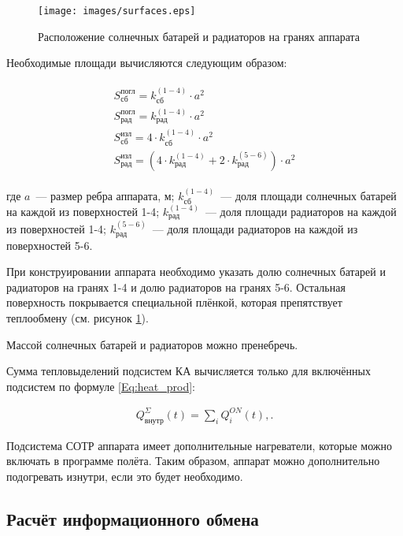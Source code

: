 \documentclass[12pt,a4paper]{article}
\begin{document}
\begin{figure}[tbh]
  \begin{center}
    \texttt{[image: images/surfaces.eps]}
    \caption{Расположение солнечных батарей и радиаторов на гранях аппарата}
    \label{Pic:surfaces}
  \end{center}
\end{figure}

Необходимые площади вычисляются следующим образом:

\begin{eqnarray}
  \begin{array}{l}
  S_{\text{сб}}^{\text{погл}} = k^{(1-4)}_{\text{сб}} \cdot a^2 \\
  S_{\text{рад}}^{\text{погл}} = k^{(1-4)}_{\text{рад}} \cdot a^2 \\
  S_{\text{сб}}^{\text{изл}} = 4 \cdot k^{(1-4)}_{\text{сб}} \cdot a^2 \\
  S_{\text{рад}}^{\text{изл}} = (4 \cdot k^{(1-4)}_{\text{рад}} + 2 \cdot
  k^{(5-6)}_{\text{рад}}) \cdot a^2
  \end{array}
\end{eqnarray}

где $a$~--- размер ребра аппарата, м; $k^{(1-4)}_{\text{сб}}$~--- доля площади солнечных батарей на каждой из
поверхностей 1-4; $k^{(1-4)}_{\text{рад}}$~--- доля площади радиаторов на каждой из поверхностей 1-4;
$k^{(5-6)}_{\text{рад}}$~--- доля площади радиаторов на каждой из поверхностей 5-6.

При конструировании аппарата необходимо указать долю солнечных батарей и радиаторов на
гранях 1-4 и долю радиаторов на гранях 5-6. Остальная поверхность покрывается специальной
плёнкой, которая препятствует теплообмену (см. рисунок \ref{Pic:surfaces}).

Массой солнечных батарей и радиаторов можно пренебречь.

Сумма тепловыделений подсистем КА вычисляется только для включённых подсистем по формуле
\ref{Eq:heat_prod}:

\begin{eqnarray}
Q^{\Sigma}_{\text{внутр}}(t) = \sum_i Q_{i}^{ON}(t), \label{Eq:heat_prod}.
\end{eqnarray}

Подсистема СОТР аппарата имеет дополнительные нагреватели, которые можно включать в
программе полёта. Таким образом, аппарат можно дополнительно подогревать изнутри, если это
будет необходимо.

\subsection{Расчёт информационного обмена}
\label{Sec:Radio}
\end{document}
